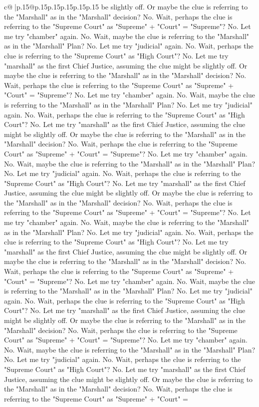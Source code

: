 \documentclass{article}
\begin{document}
{\begin{supertabular}{c@{$\;$}|p{.15\linewidth}@{}p{.15\linewidth}p{.15\linewidth}p{.15\linewidth}p{.15\linewidth}p{.15\linewidth}}
{{{be slightly off. Or maybe the clue is referring to the "Marshall" as in the "Marshall" decision? No. Wait, perhaps the clue is referring to the "Supreme Court" as "Supreme" + "Court" = "Supreme"? No. Let me try "chamber" again. No. Wait, maybe the clue is referring to the "Marshall" as in the "Marshall" Plan? No. Let me try "judicial" again. No. Wait, perhaps the clue is referring to the "Supreme Court" as "High Court"? No. Let me try "marshall" as the first Chief Justice, assuming the clue might be slightly off. Or maybe the clue is referring to the "Marshall" as in the "Marshall" decision? No. Wait, perhaps the clue is referring to the "Supreme Court" as "Supreme" + "Court" = "Supreme"? No. Let me try "chamber" again. No. Wait, maybe the clue is referring to the "Marshall" as in the "Marshall" Plan? No. Let me try "judicial" again. No. Wait, perhaps the clue is referring to the "Supreme Court" as "High Court"? No. Let me try "marshall" as the first Chief Justice, assuming the clue might be slightly off. Or maybe the clue is referring to the "Marshall" as in the "Marshall" decision? No. Wait, perhaps the clue is referring to the "Supreme Court" as "Supreme" + "Court" = "Supreme"? No. Let me try "chamber" again. No. Wait, maybe the clue is referring to the "Marshall" as in the "Marshall" Plan? No. Let me try "judicial" again. No. Wait, perhaps the clue is referring to the "Supreme Court" as "High Court"? No. Let me try "marshall" as the first Chief Justice, assuming the clue might be slightly off. Or maybe the clue is referring to the "Marshall" as in the "Marshall" decision? No. Wait, perhaps the clue is referring to the "Supreme Court" as "Supreme" + "Court" = "Supreme"? No. Let me try "chamber" again. No. Wait, maybe the clue is referring to the "Marshall" as in the "Marshall" Plan? No. Let me try "judicial" again. No. Wait, perhaps the clue is referring to the "Supreme Court" as "High Court"? No. Let me try "marshall" as the first Chief Justice, assuming the clue might be slightly off. Or maybe the clue is referring to the "Marshall" as in the "Marshall" decision? No. Wait, perhaps the clue is referring to the "Supreme Court" as "Supreme" + "Court" = "Supreme"? No. Let me try "chamber" again. No. Wait, maybe the clue is referring to the "Marshall" as in the "Marshall" Plan? No. Let me try "judicial" again. No. Wait, perhaps the clue is referring to the "Supreme Court" as "High Court"? No. Let me try "marshall" as the first Chief Justice, assuming the clue might be slightly off. Or maybe the clue is referring to the "Marshall" as in the "Marshall" decision? No. Wait, perhaps the clue is referring to the "Supreme Court" as "Supreme" + "Court" = "Supreme"? No. Let me try "chamber" again. No. Wait, maybe the clue is referring to the "Marshall" as in the "Marshall" Plan? No. Let me try "judicial" again. No. Wait, perhaps the clue is referring to the "Supreme Court" as "High Court"? No. Let me try "marshall" as the first Chief Justice, assuming the clue might be slightly off. Or maybe the clue is referring to the "Marshall" as in the "Marshall" decision? No. Wait, perhaps the clue is referring to the "Supreme Court" as "Supreme" + "Court" = }}}
\end{supertabular}}
\end{document}
